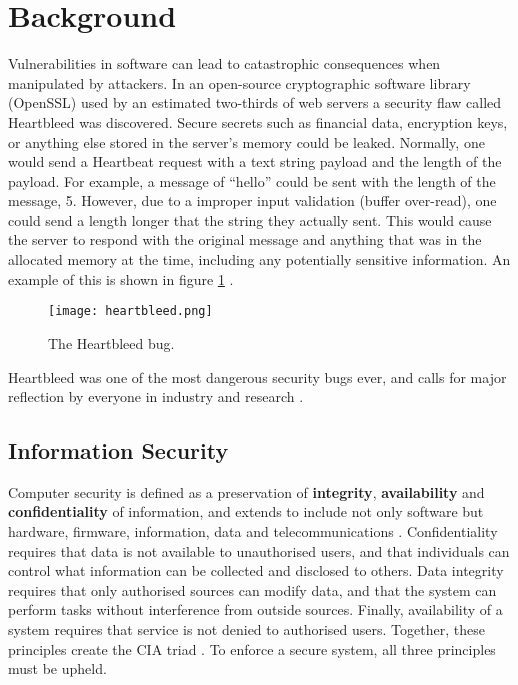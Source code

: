 
\section{Background}
Vulnerabilities in software can lead to catastrophic consequences when manipulated by attackers. In an open-source cryptographic software library (OpenSSL) used by an estimated two-thirds of web servers \cite{heartbleed} a security flaw called Heartbleed was discovered. Secure secrets such as financial data, encryption keys, or anything else stored in the server's memory could be leaked. Normally, one would send a Heartbeat request with a text string payload and the length of the payload. For example, a message of ``hello'' could be sent with the length of the message, 5. However, due to a improper input validation (buffer over-read), one could send a length longer that the string they actually sent. This would cause the server to respond with the original message and anything that was in the allocated memory at the time, including any potentially sensitive information. An example of this is shown in figure \ref{fig:heartbleed} \cite{heartbleedimg}.

\begin{figure}
    \centering
    \texttt{[image: heartbleed.png]}
    \caption{The Heartbleed bug. \cite{heartbleedimg}}
    \label{fig:heartbleed}
\end{figure}

Heartbleed was one of the most dangerous security bugs ever, and calls for major reflection by everyone in industry and research \cite{balliu2014logics}.

\subsection{Information Security}

Computer security is defined as a preservation of \textbf{integrity}, \textbf{availability} and \textbf{confidentiality} of information, and extends to include not only software but hardware, firmware, information, data and telecommunications \cite{guttman1995introduction}.
Confidentiality requires that data is not available to unauthorised users, and that individuals can control what information can be collected and disclosed to others. Data integrity requires that only authorised sources can modify data, and that the system can perform tasks without interference from outside sources. Finally, availability of a system requires that service is not denied to authorised users. Together, these principles create the CIA triad \cite{stallings2012computer}. To enforce a secure system, all three principles must be upheld.

